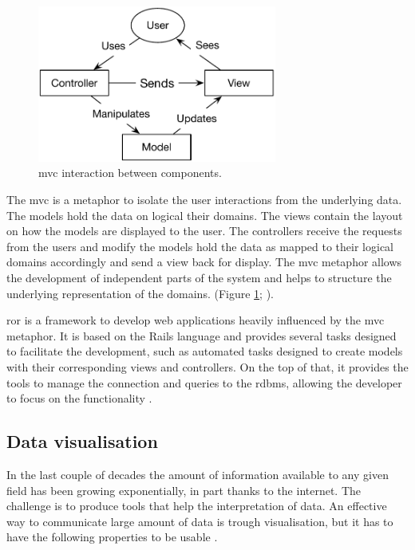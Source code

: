\begin{figure} 
  \centering
  \includegraphics[width=0.7\textwidth]{LitReview/Figures/MVC.pdf}
  \caption{\acrshort{mvc} interaction between components.}
  \label{fig:poly:mvc}
\end{figure}
The \gls{mvc} is a metaphor to isolate the user interactions from the underlying data. 
The models hold the data on logical their domains.
The views contain the layout on how the models are displayed to the user.
The controllers receive the requests from the users and modify the models hold the data as mapped to their logical domains accordingly and send a view back for display. 
The \acrshort{mvc} metaphor allows the development of independent parts of the system and helps to structure the underlying representation of the domains.  (Figure \ref{fig:poly:mvc}; \citealt{Krasner1988}).

\gls{ror} is a framework to develop web applications heavily influenced by the \acrshort{mvc} metaphor. 
It is based on the Rails language and provides several tasks designed to facilitate the development, such as automated tasks designed to create models with their corresponding views and controllers. 
On the top of that, it provides the tools to manage the connection and queries to the \acrshort{rdbms}, allowing the developer to focus on the functionality \citep{RailsGuide2016}. 

\subsection{Data visualisation}

In the last couple of decades the amount of information available to any given field has been growing exponentially, in part thanks to the internet. 
The challenge is to produce tools that help the interpretation of data. 
An effective way to communicate large amount of data is trough visualisation, but it has to have the following properties to be usable \citep{Myatt2011}.

